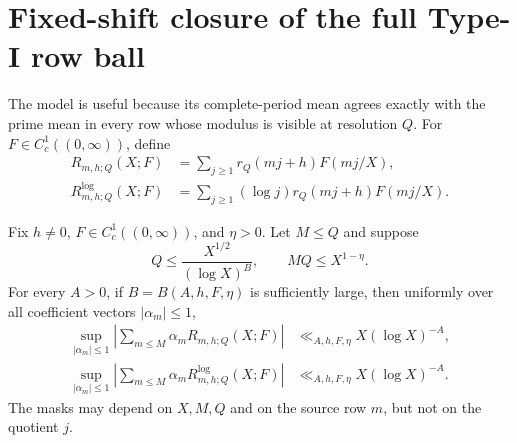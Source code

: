 \section{Fixed-shift closure of the full Type-I row ball}
\label{sec:fixed-typei-closure}

The model is useful because its complete-period mean agrees exactly with
the prime mean in every row whose modulus is visible at resolution $Q$.
For $F\in C_c^1((0,\infty))$, define
\begin{align}
 R_{m,h;Q}(X;F)
 &=\sum_{j\geq1}r_Q(mj+h)F(mj/X),
 \label{eq:ordinary-TypeI-row}\\
 R^{\log}_{m,h;Q}(X;F)
 &=\sum_{j\geq1}(\log j)r_Q(mj+h)F(mj/X).
 \label{eq:log-TypeI-row}
\end{align}

\begin{theorem}
\label{thm:full-bounded-TypeI-rows}
Fix $h\ne0$, $F\in C_c^1((0,\infty))$, and $\eta>0$.  Let
$M\leq Q$ and suppose
\begin{equation}
 Q\leq\frac{X^{1/2}}{(\log X)^{B}},
 \qquad
 MQ\leq X^{1-\eta}.
 \label{eq:TypeI-row-parameter-range}
\end{equation}
For every $A>0$, if $B=B(A,h,F,\eta)$ is sufficiently large, then
uniformly over all coefficient vectors $|\alpha_m|\leq1$,
\begin{align}
 \sup_{|\alpha_m|\leq1}
 \left|\sum_{m\leq M}\alpha_mR_{m,h;Q}(X;F)\right|
 &\ll_{A,h,F,\eta}X(\log X)^{-A},
 \label{eq:full-bounded-TypeI-row-closure}\\
 \sup_{|\alpha_m|\leq1}
 \left|\sum_{m\leq M}\alpha_mR^{\log}_{m,h;Q}(X;F)\right|
 &\ll_{A,h,F,\eta}X(\log X)^{-A}.
 \label{eq:full-bounded-log-TypeI-row-closure}
\end{align}
The masks may depend on $X,M,Q$ and on the source row $m$, but not on the
quotient $j$.
\end{theorem}

